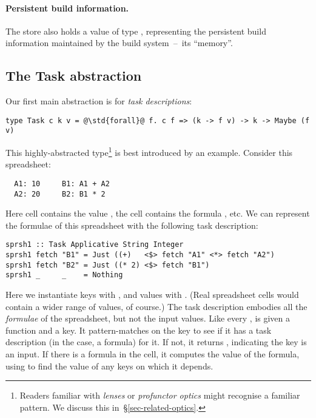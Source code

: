 \paragraph{Persistent build information.}
The store also holds a value of type ,
representing the persistent build information maintained by the build
system~--~its ``memory''.



\subsection{The Task abstraction}\label{sec-task}

Our first main abstraction is for \emph{task descriptions}:
\begin{verbatim}
type Task c k v = @\std{forall}@ f. c f => (k -> f v) -> k -> Maybe (f v)
\end{verbatim}
This highly-abstracted type\footnote{Readers familiar with \emph{lenses} or
\emph{profunctor optics} might recognise a familiar pattern. We discuss this
in~\S\ref{sec-related-optics}.} is best introduced by an example.
Consider this \Excel spreadsheet:
\vspace{1mm}
\begin{verbatim}
  A1: 10     B1: A1 + A2
  A2: 20     B2: B1 * 2
\end{verbatim}
\vspace{1mm}
Here cell  contains the value , the cell  contains
the formula , etc. We can represent the formulae of this spreadsheet
with the following task description:
\vspace{1mm}
\begin{verbatim}
sprsh1 :: Task Applicative String Integer
sprsh1 fetch "B1" = Just ((+)   <$> fetch "A1" <*> fetch "A2")
sprsh1 fetch "B2" = Just ((* 2) <$> fetch "B1")
sprsh1 _     _    = Nothing
\end{verbatim}
\vspace{1mm}
Here we instantiate keys  with , and values  with .
(Real spreadsheet cells would contain a wider range of values, of course.)
The task description  embodies all the \emph{formulae} of the spreadsheet,
but not the input values.  Like every ,  is given a
 function and a key. It pattern-matches on the key to see if it has a
task description (in the \Excel case, a formula) for it. If not, it returns
, indicating the key is an input. If there is a formula in the cell,
it computes the value of the formula, using  to find the value of any
keys on which it depends.

